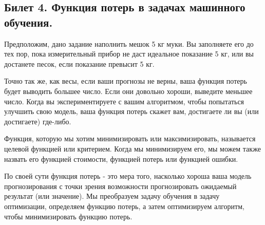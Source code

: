 \documentclass[a4paper, 12pt]{article}
\begin{document}
	\subsection*{Билет 4. Функция потерь в задачах машинного обучения.}
	Предположим, дано задание наполнить мешок 5 кг муки. Вы заполняете его до тех пор, пока измерительный прибор не даст идеальное показание 5 кг, или вы достанете песок, если показание превысит 5 кг.
	
	Точно так же, как весы, если ваши прогнозы не верны, ваша функция потерь будет выводить большее число. Если они довольно хороши, выведите меньшее число. Когда вы экспериментируете с вашим алгоритмом, чтобы попытаться улучшить свою модель, ваша функция потерь скажет вам, достигаете ли вы (или достигаете) где-либо.
	
	Функция, которую мы хотим минимизировать или максимизировать, называется целевой функцией или критерием. Когда мы минимизируем его, мы можем также назвать его функцией стоимости, функцией потерь или функцией ошибки.
	
	По своей сути функция потерь - это мера того, насколько хороша ваша модель прогнозирования с точки зрения возможности прогнозировать ожидаемый результат (или значение). Мы преобразуем задачу обучения в задачу оптимизации, определяем функцию потерь, а затем оптимизируем алгоритм, чтобы минимизировать функцию потерь.
	
\end{document}
